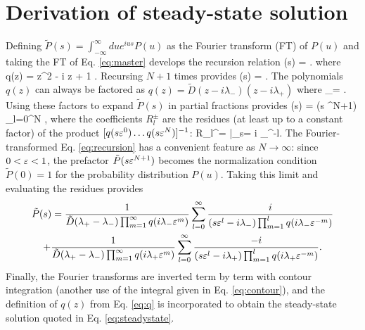 \section{Derivation of steady-state solution}
\label{sec:langsteadyderiv}
Defining $\tilde{P}(s) = \int_{-\infty}^\infty du e^{i u s} P(u) $ as the Fourier transform (FT) of $P(u)$ and taking the FT of Eq. \ref{eq:master} develops the recursion relation
\be {}(s) = . \ee
where
\be q(z) =  z^2 - i \tilde{\Gamma} z + 1 . \label{eq:q} \ee
Recursing $N+1$ times provides
\be {}(s) = .\label{eq:recursion}\ee
The polynomials $q(z)$ can always be factored as $q(z) = \tilde{D}(z - i\lambda_-)(z - i\lambda_+)$ where
\be \lambda_\pm = . \label{eq:lambdas}\ee
Using these factors to expand $\tilde{P}(s)$ in partial fractions provides
\be {}(s)  = (s \ve^{N+1}) \sum_{l=0}^N   ,\ee
where the coefficients $R_l^\pm$ are the residues (at least up to a constant factor) of the product $[q(s\varepsilon^0)\dots q(s\varepsilon^N)]^{-1}$:
\be R_l^\pm =  \Big|_{s= i \lambda_\pm \ve^{-l}}.\ee
The Fourier-transformed Eq. \ref{eq:recursion} has a convenient feature as $N\rightarrow \infty$: since $0<\varepsilon <1$, the prefactor $\tilde{P}( s \varepsilon^{N+1})$ becomes the normalization condition $\tilde{P}(0)=1$ for the probability distribution $P(u)$.
Taking this limit and evaluating the residues provides 
\begin{multline} \tilde{P}(s) = \frac{1}{\tilde{D}(\lambda_+ - \lambda_-) \prod_{m=1}^\infty q(i \lambda_- \varepsilon^m)} \sum_{l=0}^\infty \frac{i}{(s\varepsilon^l-i\lambda_-)\prod_{m=1}^l q(i\lambda_- \varepsilon^{-m})} 
	\\+ \frac{1}{\tilde{D}(\lambda_+ - \lambda_-) \prod_{m=1}^\infty q(i \lambda_+ \varepsilon^m)} \sum_{l=0}^\infty \frac{-i}{(s\varepsilon^l-i \lambda_+)\prod_{m=1}^l q(i\lambda_+ \varepsilon^{-m})}. \end{multline}
Finally, the Fourier transforms are inverted term by term with contour integration (another use of the integral given in Eq. \ref{eq:contour}), and the definition of $q(z)$ from Eq. \ref{eq:q} is incorporated to obtain the steady-state solution quoted in Eq. \ref{eq:steadystate}.

